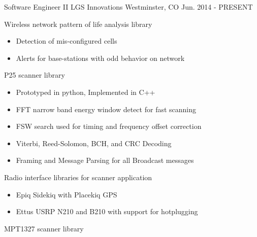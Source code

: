 

\begin{cventries}

  \cventry
    {Software Engineer II} %
    {LGS Innovations} %
    {Westminster, CO} %
    {Jun. 2014 - PRESENT} %
    {
      \begin{cvitems} %
        \item {Wireless network pattern of life analysis library}
        \begin{itemize}
          \item {Detection of mis-configured cells}
          \item {Alerts for base-stations with odd behavior on network}
        \end{itemize}
        \item {P25 scanner library}
        \begin{itemize}
          \item {Prototyped in python, Implemented in C++}
          \item {FFT narrow band energy window detect for fast scanning}
          \item {FSW search used for timing and frequency offset correction}
          \item {Viterbi, Reed-Solomon, BCH, and CRC Decoding}
          \item {Framing and Message Parsing for all Broadcast messages}
        \end{itemize}
        \item {Radio interface libraries for scanner application}
        \begin{itemize}
          \item {Epiq Sidekiq with Placekiq GPS}
          \item {Ettus USRP N210 and B210 with support for hotplugging}
        \end{itemize}
        \item {MPT1327 scanner library}
        \begin{itemize}

\end{itemize}
\end{cvitems}}
\end{cventries}
